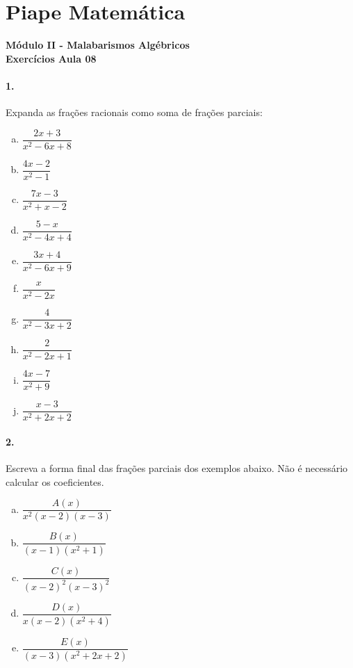 \documentclass[a4paper,12pt]{article}
\begin{document}
 
  
\section*{Piape Matemática} 
\textbf{Módulo II - Malabarismos Algébricos}\\
\textbf{Exercícios Aula 08}         
\begin{multicols}{2}
\paragraph*{1.} Expanda as frações racionais como soma de frações parciais:
\begin{enumerate}[a)] 
    \item $\dfrac{2 x + 3}{x^{2} - 6 x + 8}$
    \item $\dfrac{4 x - 2}{x^{2} - 1}$
    \item $\dfrac{7 x - 3}{x^{2} + x - 2}$
    \item $\dfrac{5 - x}{x^{2} - 4 x + 4}$
    \item $\dfrac{3 x + 4}{x^{2} - 6 x + 9}$
    \item $\dfrac{x}{x^{2} - 2 x}$
    \item $\dfrac{4}{x^{2} - 3 x + 2}$
    \item $\dfrac{2}{x^{2} - 2 x + 1}$
    \item $\dfrac{4 x - 7}{x^{2} + 9}$
    \item $\dfrac{x - 3}{x^2+2x+2}$
\end{enumerate}

\paragraph*{2.} Escreva a forma final das frações parciais dos exemplos abaixo. Não é necessário calcular os coeficientes.

\begin{enumerate}[a)]
    \item $\dfrac{A(x)}{x^2(x-2)(x-3)}$
    \item $\dfrac{B(x)}{(x-1)(x^2+1)}$
    \item $\dfrac{C(x)}{(x-2)^2(x-3)^2}$
    \item $\dfrac{D(x)}{x(x-2)(x^2+4)}$
    \item $\dfrac{E(x)}{(x-3)(x^2+2x+2)}$
\end{enumerate}
 
\vspace*{3cm}
\end{multicols}
 
\end{document}
